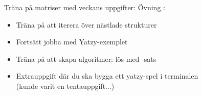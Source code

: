 
\ifkompendium\else
\begin{Slide}{Träna på matriser med veckans uppgifter:}\SlideFontSmall
Övning :
\begin{itemize}
\item Träna på att iterera över nästlade strukturer

\item Fortsätt jobba med Yatzy-exemplet

\item Träna på att skapa  algoritmer: 
lös  med -sats 

\item Extrauppgift där du ska bygga ett yatzy-spel i terminalen\\(kunde varit en tentauppgift...)

\end{itemize}
\end{Slide}
\fi

%
%
%
%
%
%
%
%


